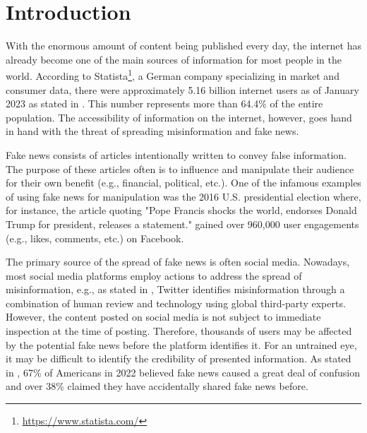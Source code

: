 

\chapter{Introduction}
With the enormous amount of content being published every day, the internet has already become one of the main sources of information for most people in the world. According to Statista\footnote{\url{https://www.statista.com/}}, a German company specializing in market and consumer data, there were approximately 5.16 billion internet users as of January 2023 as stated in \cite{intro-statista1}. This number represents more than 64.4\% of the entire population. The accessibility of information on the internet, however, goes hand in hand with the threat of spreading misinformation and fake news.

Fake news consists of articles intentionally written to convey false information. The purpose of these articles often is to influence and manipulate their audience for their own benefit (e.g., financial, political, etc.). One of the infamous examples of using fake news for manipulation was the 2016 U.S. presidential election where, for instance, the article \cite{intro-pope} quoting "Pope Francis shocks the world, endorses Donald Trump for president, releases a statement." gained over 960,000 user engagements (e.g., likes, comments, etc.) on Facebook.

The primary source of the spread of fake news is often social media. Nowadays, most social media platforms employ actions to address the spread of misinformation, e.g., as stated in \cite{twitter}, Twitter identifies misinformation through a combination of human review and technology using global third-party experts. However, the content posted on social media is not subject to immediate inspection at the time of posting. Therefore, thousands of users may be affected by the potential fake news before the platform identifies it. For an untrained eye, it may be difficult to identify the credibility of presented information. As stated in \cite{intro-statista2}, 67\% of Americans in 2022 believed fake news caused a great deal of confusion and over 38\% claimed they have accidentally shared fake news before.

